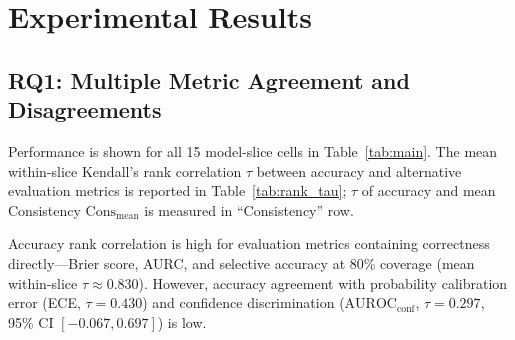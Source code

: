 \documentclass[sigconf,nonacm]{acmart}
\makeatletter
\DeclareRobustCommand{\_}{\ifmmode\nfss@text{\textunderscore}\else\textunderscore\allowbreak\fi}
\newcommand{\fitwidth}[2]{%
  \sbox{\fitbox}{#2}%
  \ifdim\wd\fitbox>#1\relax
    \resizebox{#1}{!}{\usebox{\fitbox}}%
  \else
    \usebox{\fitbox}%
  \fi}
\makeatother
\begin{document}
\section{Experimental Results}

\begin{table}[!t]
\centering
\caption{Main benchmark results per model and slice.}
\label{tab:main}
\small
\setlength{\tabcolsep}{3.5pt}
\fitwidth{\textwidth}{}
\end{table}

\begin{table}[!t]
\centering
\caption{Mean within-slice Kendall's $\tau$ between accuracy and alternative metrics across slices ($N_{\mathrm{slices}}=5$).}
\label{tab:rank_tau}
\small
\fitwidth{\columnwidth}{}
\end{table}

\begin{table}[!t]
\centering
\caption{Paired McNemar tests between models on each slice. $p$-values are Holm-Bonferroni adjusted across all comparisons.}
\label{tab:paired}
\small
\fitwidth{\textwidth}{}
\end{table}

\subsection{RQ1: Multiple Metric Agreement and Disagreements}
Performance is shown for all 15 model-slice cells in Table~\ref{tab:main}. The mean within-slice Kendall's rank correlation $\tau$ between accuracy and alternative evaluation metrics is reported in Table~\ref{tab:rank_tau}; $\tau$ of accuracy and mean Consistency $\text{Cons}_{\text{mean}}$ is measured in ``Consistency'' row.

Accuracy rank correlation is high for evaluation metrics containing correctness directly---Brier score, AURC, and selective accuracy at 80\% coverage (mean within-slice $\tau \approx 0.830$). However, accuracy agreement with probability calibration error (ECE, $\tau = 0.430$) and confidence discrimination ($\text{AUROC}_{\text{conf}}$, $\tau = 0.297$, 95\% CI $[-0.067, 0.697]$) is low.
\end{document}
